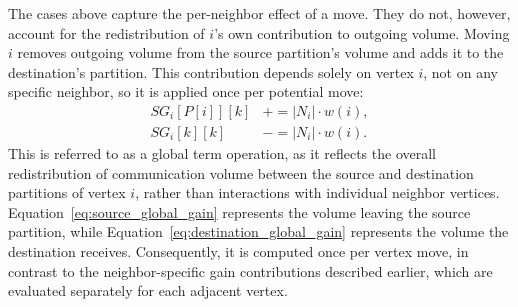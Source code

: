 
The cases above capture the per-neighbor effect of a move. They do not, however, account for the redistribution of $i$'s own contribution to outgoing volume. Moving $i$ removes outgoing volume from the source partition's volume and adds it to the destination's partition. This contribution depends solely on vertex $i$, not on any specific neighbor, so it is applied once per potential move:
\begin{align}
	SG_i[P[i]][k] &\label{eq:source_global_gain} \mathrel{+}= \left| N_i \right| \cdot w(i),\\
	SG_i[k][k]    &\label{eq:destination_global_gain}\mathrel{-}= \left| N_i \right| \cdot w(i).
\end{align}
This is referred to as a global term operation, as it reflects the overall redistribution of communication volume between the source and destination partitions of vertex $i$, rather than interactions with individual neighbor vertices. Equation~\ref{eq:source_global_gain} represents the volume leaving the source partition, while Equation~\ref{eq:destination_global_gain} represents the volume the destination receives. Consequently, it is computed once per vertex move, in contrast to the neighbor-specific gain contributions described earlier, which are evaluated separately for each adjacent vertex. 

